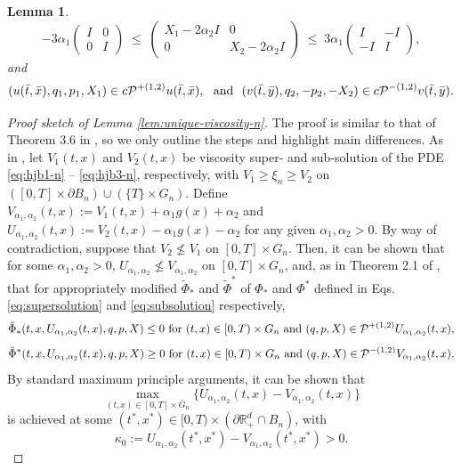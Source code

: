 \documentclass[11pt]{article}
\theoremstyle{definition}
\theoremstyle{plain}
\newtheorem{lemma}[assumption]{Lemma}
\newcommand{\R}{\mathbb{R}}
\newcommand{\cP}{{\cal P}}
\begin{document}
\begin{appendices}
\begin{lemma}
\[
- 3\alpha_1
\begin{pmatrix}
I & 0\\
0 & I
\end{pmatrix}
\;\le\;
\begin{pmatrix}
X_1-2\alpha_2 I & 0\\
0 & X_2-2\alpha_2 I
\end{pmatrix}
\;\le\;
3\alpha_1
\begin{pmatrix}
I & -I\\
-I & I
\end{pmatrix},
\]
and 
\[
(u(\bar t, \bar x), q_1, p_1, X_1) \in c\cP^{+(1,2)} u(\bar t, \bar x), \ \text{ and } \
(v(\bar t, \bar y), q_2, -p_2, -X_2) \in c\cP^{-(1,2)} v(\bar t, \bar y).
\]
\end{lemma}
\begin{proof}[Proof sketch of Lemma \ref{lem:unique-viscosity-n}] 
The proof is similar to that of Theorem 3.6 in \cite{borkar2004ergodic}, so we only outline the steps 
and highlight main differences. As in \cite{borkar2004ergodic}, 
let $V_1(t,x)$ and $V_2(t,x)$ be viscosity super- and sub-solution of the PDE \eqref{eq:hjb1-n} -- \eqref{eq:hjb3-n}, respectively, 
with $V_1 \ge \xi_n \ge V_2$ on $\left([0,T]\times \partial B_n \right) \cup \left(\{T\} \times G_n\right)$. 
Define $V_{\alpha_1,\alpha_2}(t,x) := V_1(t,x) + \alpha_1 g(x) + \alpha_2$ 
and $U_{\alpha_1,\alpha_2}(t,x) := V_2(t,x) - \alpha_1 g(x) - \alpha_2$ for any given $\alpha_1, \alpha_2 > 0$. 
By way of contradiction, suppose that $V_2 \nleq V_1$ on $[0,T]\times G_n$. 
Then, it can be shown that for some $\alpha_1, \alpha_2 > 0$, $U_{\alpha_1,\alpha_2} \nleq V_{\alpha_1,\alpha_2}$ on $[0,T]\times G_n$, 
and, as in Theorem 2.1 of \cite{DupuisIshii1991}, that for appropriately modified 
$\tilde \Phi_*$ and $\tilde \Phi^*$ of $\Phi_*$ and $\Phi^*$ defined in Eqs. \eqref{eq:supersolution} and \eqref{eq:subsolution} respectively, 
\[
\tilde \Phi_*(t,x,U_{\alpha_1,\alpha_2}(t,x),q,p,X) \le 0 \text{ for } (t,x) \in [0,T)\times G_n \text{ and } (q,p,X) \in \cP^{+(1,2)} U_{\alpha_1,\alpha_2}(t,x),
\]
\[
\tilde \Phi^*(t,x,U_{\alpha_1,\alpha_2}(t,x),q,p,X) \ge 0 \text{ for } (t,x) \in [0,T)\times G_n \text{ and } (q,p,X) \in \cP^{-(1,2)} V_{\alpha_1,\alpha_2}(t,x).
\]
By standard maximum principle arguments, it can be shown that 
\[
\max_{(t,x) \in [0,T]\times \bar G_n} \{U_{\alpha_1,\alpha_2}(t,x) - V_{\alpha_1,\alpha_2}(t,x)\} 
\]
is achieved at some $(t^*, x^*) \in [0,T)\times \left(\partial \R_+^d \cap B_n\right)$, 
with 
\[\kappa_0 := U_{\alpha_1,\alpha_2}(t^*, x^*) - V_{\alpha_1,\alpha_2}(t^*, x^*) > 0.\] 

\end{proof}
\end{appendices}
\end{document}
